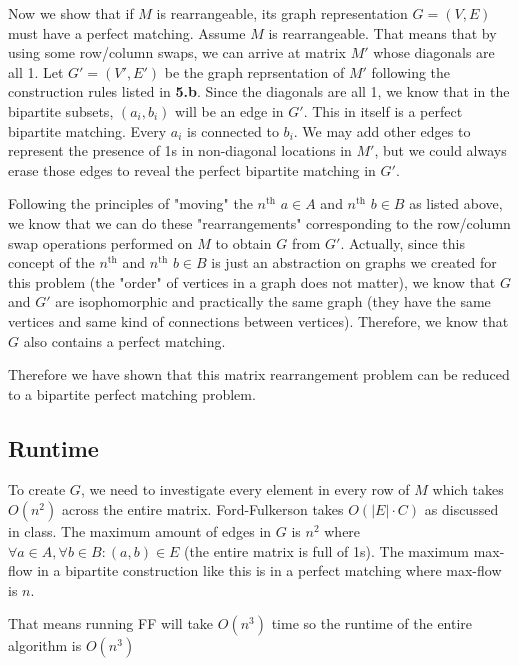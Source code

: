 \documentclass{article}
\begin{document}
\begin{enumerate}
    Now we show that if $M$ is rearrangeable, its graph representation $G = (V, E)$ must have a perfect matching.
    Assume $M$ is rearrangeable. That means that by using some row/column swaps, we can arrive at matrix $M'$ whose diagonals are all 1.
    Let $G' = (V', E')$ be the graph reprsentation of $M'$ following the construction rules listed in \textbf{5.b}.
    Since the diagonals are all 1, we know that in the bipartite subsets, $(a_i, b_i)$ will be an edge in $G'$. 
    This in itself is a perfect bipartite matching. Every $a_i$ is connected to $b_i$. We may add other edges to represent the presence of 1s in non-diagonal locations in $M'$, but we could always erase those edges to reveal the perfect bipartite matching in $G'$. 

    Following the principles of "moving" the $n^{\text{th}}$ $a\in A$ and $n^{\text{th}}$ $b\in B$ as listed above, we know that we can do these "rearrangements" corresponding to the row/column swap operations performed on $M$ to obtain $G$ from $G'$.
    Actually, since this concept of the $n^{\text{th}}$ and $n^{\text{th}}$ $b\in B$ is just an abstraction on graphs we created for this problem (the "order" of vertices in a graph does not matter), we know that $G$ and $G'$ are isophomorphic and practically the same graph (they have the same vertices and same kind of connections between vertices).
    Therefore, we know that $G$ also contains a perfect matching.

    Therefore we have shown that this matrix rearrangement problem can be reduced to a bipartite perfect matching problem.

    \subsection{Runtime}
    To create $G$, we need to investigate every element in every row of $M$ which takes $O(n^2)$ across the entire matrix.
    Ford-Fulkerson takes $O(|E| \cdot C)$ as discussed in class. The maximum amount of edges in $G$ is $n^2$ where $\forall a\in A, \forall b\in B: (a, b) \in E$ (the entire matrix is full of 1s).
    The maximum max-flow in a bipartite construction like this is in a perfect matching where max-flow is $n$.
    
    That means running FF will take $O(n^3)$ time so the runtime of the entire algorithm is $O(n^3)$

\end{enumerate}
\end{document}
